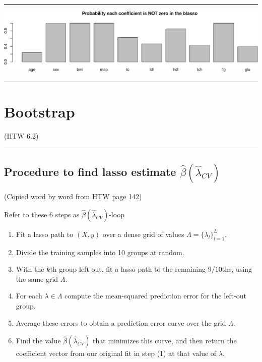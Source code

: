 \documentclass[
  letterpaper,
  DIV=11,
  numbers=noendperiod]{scrartcl}
\providecommand{\tightlist}{%
  \setlength{\itemsep}{0pt}\setlength{\parskip}{0pt}}\usepackage{longtable,booktabs,array}
\begin{document}
\begin{center}\rule{0.5\linewidth}{0.5pt}\end{center}

\includegraphics{W6_files/figure-pdf/unnamed-chunk-14-1.pdf}

\begin{center}\rule{0.5\linewidth}{0.5pt}\end{center}

\hypertarget{bootstrap}{%
\section{Bootstrap}\label{bootstrap}}

(HTW 6.2)

\begin{center}\rule{0.5\linewidth}{0.5pt}\end{center}

\hypertarget{procedure-to-find-lasso-estimate-hatbetahatlambda_cv}{%
\subsection{\texorpdfstring{Procedure to find lasso estimate
\(\hat{\beta}(\hat{\lambda}_{CV})\)}{Procedure to find lasso estimate \textbackslash hat\{\textbackslash beta\}(\textbackslash hat\{\textbackslash lambda\}\_\{CV\})}}\label{procedure-to-find-lasso-estimate-hatbetahatlambda_cv}}

(Copied word by word from HTW page 142)

Refer to these 6 steps as \(\hat{\beta}(\hat{\lambda}_{CV})\)-loop

\begin{enumerate}
\def\labelenumi{\arabic{enumi}.}
\tightlist
\item
  Fit a lasso path to \((X, y)\) over a dense grid of values
  \(\Lambda=\{\lambda_l\}_{l=1}^{L}\).
\item
  Divide the training samples into 10 groups at random.
\item
  With the \(k\)th group left out, fit a lasso path to the remaining
  \(9/10\)ths, using the same grid \(\Lambda\).
\item
  For each \(\lambda \in \Lambda\) compute the mean-squared prediction
  error for the left-out group.
\item
  Average these errors to obtain a prediction error curve over the grid
  \(\Lambda\).
\item
  Find the value \(\hat{\beta}(\hat{\lambda}_{CV})\) that minimizes this
  curve, and then return the coefficient vector from our original fit in
  step (1) at that value of \(\lambda\).
\end{enumerate}
\end{document}
